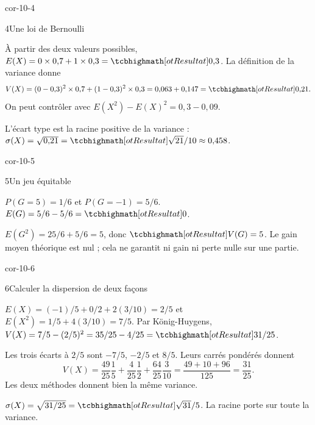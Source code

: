 \begin{blocLivre}{cor-10-4}
\begin{corrige}{4}{Une loi de Bernoulli}
\begin{questions}
\item À partir des deux valeurs possibles,
$E(X)=0\times0{,}7+1\times0{,}3=\res{0{,}3}$.
La définition de la variance donne
\[V(X)=(0-0{,}3)^2\times0{,}7+(1-0{,}3)^2\times0{,}3
=0{,}063+0{,}147=\res{0{,}21}.\]
On peut contrôler avec $E(X^2)-E(X)^2=0{,}3-0{,}09$.
\item L’écart type est la racine positive de la variance :
$\sigma(X)=\sqrt{0{,}21}=\res{\sqrt{21}/10\approx0{,}458}$.
\end{questions}

\end{corrige}
\end{blocLivre}
\begin{blocLivre}{cor-10-5}
\begin{corrige}{5}{Un jeu équitable}
\begin{questions}
\item $P(G=5)=1/6$ et $P(G=-1)=5/6$. $E(G)=5/6-5/6=\res{0}$.
\item $E(G^2)=25/6+5/6=5$, donc $\res{V(G)=5}$. Le gain moyen théorique est nul ; cela ne garantit ni gain ni perte nulle sur une partie.
\end{questions}
\label{figlivre-r10-05-loi-cor}

\end{corrige}
\end{blocLivre}
\begin{blocLivre}{cor-10-6}
\begin{corrige}{6}{Calculer la dispersion de deux façons}
\begin{questions}
\item $E(X)=(-1)/5+0/2+2(3/10)=2/5$ et $E(X^2)=1/5+4(3/10)=7/5$.
Par König-Huygens, $V(X)=7/5-(2/5)^2=35/25-4/25=\res{31/25}$.
\item Les trois écarts à $2/5$ sont $-7/5$, $-2/5$ et $8/5$.
Leurs carrés pondérés donnent
\[V(X)=\frac{49}{25}\frac15+\frac4{25}\frac12+\frac{64}{25}\frac3{10}
=\frac{49+10+96}{125}=\frac{31}{25}.\]
Les deux méthodes donnent bien la même variance.
\item $\sigma(X)=\sqrt{31/25}=\res{\sqrt{31}/5}$.
La racine porte sur toute la variance.
\end{questions}

\end{corrige}
\end{blocLivre}
